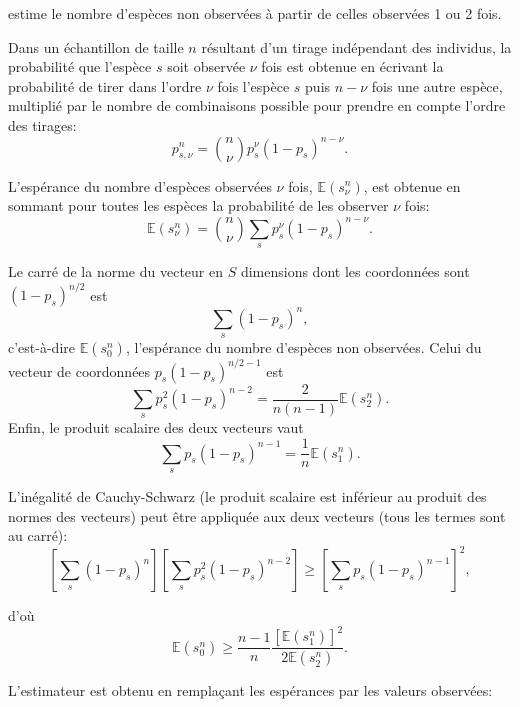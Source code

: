 \documentclass[
  11pt,
  french,
  a4paper,
  extrafontsizes,onecolumn,openright
  ]{memoir}
\begin{document}
\textcite{Chao1984} estime le nombre d'espèces non observées à partir de celles observées 1 ou 2 fois.

Dans un échantillon de taille \(n\) résultant d'un tirage indépendant des individus, la probabilité que l'espèce \(s\) soit observée \(\nu\) fois est obtenue en écrivant la probabilité de tirer dans l'ordre \(\nu\) fois l'espèce \(s\) puis \(n-\nu\) fois une autre espèce, multiplié par le nombre de combinaisons possible pour prendre en compte l'ordre des tirages:
\begin{equation}
  \label{eq:psnu}
  p^{n}_{s, \nu} = \binom{n}{\nu} {p_s^\nu \left( 1-p_s \right)^{n-\nu}}.
\end{equation}

L'espérance du nombre d'espèces observées \(\nu\) fois, \({\mathbb E}(s^{n}_{\nu})\), est obtenue en sommant pour toutes les espèces la probabilité de les observer \(\nu\) fois:
\begin{equation}
  \label{eq:Esnnu}
  {\mathbb E}\left( s^{n}_{\nu} \right) = \binom{n}{\nu} \sum_s{p_s^\nu \left( 1-p_s \right)^{n-\nu}}.
\end{equation}

Le carré de la norme du vecteur en \(S\) dimensions dont les coordonnées sont \((1-p_s)^{n/2}\) est
\[\sum_s{(1-p_s)^n},\]
c'est-à-dire \({\mathbb E}(s^{n}_{0})\), l'espérance du nombre d'espèces non observées.
Celui du vecteur de coordonnées \(p_s (1-p_s)^{n/2-1}\) est
\[\sum_s{p_s^2(1-p_s)^{n-2}}=\frac{2}{n(n-1)}{\mathbb E}(s^{n}_{2}).\]
Enfin, le produit scalaire des deux vecteurs vaut
\[\sum_s{p_s(1-p_s)^{n-1}}=\frac{1}{n}{\mathbb E}(s^{n}_{1}).\]

L'inégalité de Cauchy-Schwarz (le produit scalaire est inférieur au produit des normes des vecteurs) peut être appliquée aux deux vecteurs (tous les termes sont au carré):
\begin{equation}
  \label{eq:CauchySchwarz}
  \left[ \sum_s{(1-p_s)^n} \right] \left[ \sum_s{p_s^2(1-p_s)^{n-2}} \right] 
   \ge \left[ \sum_s{p_s(1-p_s)^{n-1}} \right]^2,
\end{equation}

d'où
\begin{equation}
  \label{eq:Esn0}
  {\mathbb E}(s^{n}_{0}) 
  \ge \frac{n-1}{n}\frac{\left[ {\mathbb E}(s^{n}_{1}) \right]^2}{2 {\mathbb E}(s^{n}_{2})}.
\end{equation}

L'estimateur est obtenu en remplaçant les espérances par les valeurs observées:
\end{document}
